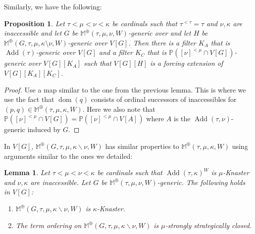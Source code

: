 \documentclass[a4paper]{amsart}
\theoremstyle{definition}
\theoremstyle{remark}
\theoremstyle{plain}
\newtheorem{mylem}[mydef]{Lemma}
\newtheorem{mypro}[mydef]{Proposition}
\numberwithin{mydef}{section}
\DeclareMathOperator{\dom}{dom}
\DeclareMathOperator{\Add}{Add}
\newcommand{\dM}{\mathbb{M}}
\newcommand{\dP}{\mathbb{P}}
\newcommand{\dQ}{\mathbb{Q}}
\begin{document}
	Similarly, we have the following:
	
	\begin{mypro}\label{little-factors} Let $\tau<\mu<\nu<\kappa$ be cardinals such that $\tau^{<\tau}=\tau$ and $\nu,\kappa$ are inaccessible and let $G$ be $\dM^\oplus(\tau,\mu,\nu,W)$-generic over and let $H$ be $\dM^\oplus(G,\tau,\mu,\kappa \setminus \nu,W)$-generic over $V[G]$. Then there is a filter $K_A$ that is $\Add(\tau)$-generic over $V[G]$ and a filter $K_C$ that is $\dP([\nu]^{<\mu} \cap V[G])$-generic over $V[G][K_A]$ such that $V[G][H]$ is a forcing extension of $V[G][K_A][K_C]$.\end{mypro}


\begin{proof} Use a map similar to the one from the previous lemma. This is where we use the fact that $\dom(q)$ consists of ordinal successors of inaccessibles for $(p,q) \in \dM^\oplus(\tau,\mu,\kappa,W)$. Here we also note that $\dP([\nu]^{<\mu} \cap V[G]) = \dP([\nu]^{<\mu} \cap V[A])$ where $A$ is the $\Add(\tau,\nu)$-generic induced by $G$.\end{proof}
	
	In $V[G]$, $\dM^\oplus(G,\tau,\mu,\kappa\smallsetminus\nu,W)$ has similar properties to $\dM^\oplus(\tau,\mu,\kappa,W)$ using arguments similar to the ones we detailed:
	
	\begin{mylem}\label{M3DecProp}
		Let $\tau<\mu<\nu<\kappa$ be cardinals such that $\Add(\tau,\kappa)^W$ is $\mu$-Knaster and $\nu,\kappa$ are inaccessible. Let $G$ be $\dM^\oplus(\tau,\mu,\nu,W)$-generic. The following holds in $V[G]$:
		\begin{enumerate}
			\item $\dM^\oplus(G,\tau,\mu,\kappa\smallsetminus\nu,W)$ is $\kappa$-Knaster.
			\item The term ordering on $\dM^\oplus(G,\tau,\mu,\kappa\smallsetminus\nu,W)$ is $\mu$-strongly strategically closed.
		\end{enumerate}
	\end{mylem}
	
\end{document}
